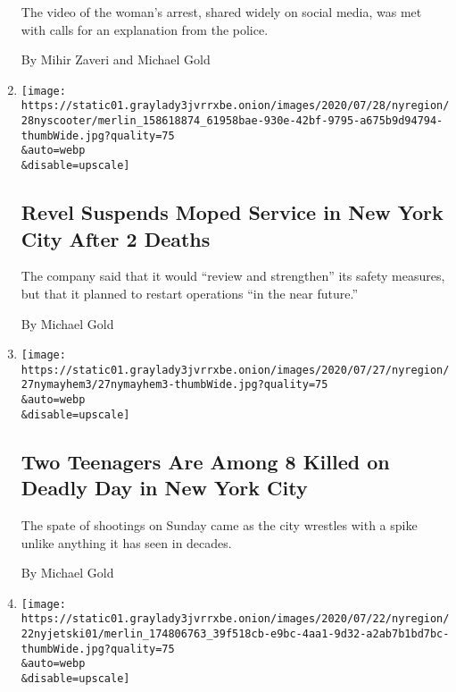 \begin{enumerate}
  The video of the woman's arrest, shared widely on social media, was
  met with calls for an explanation from the police.

  By Mihir Zaveri and Michael Gold
\item
  \href{/2020/07/28/nyregion/revel-scooters-death-nyc.html}{}

  \texttt{[image: https://static01.graylady3jvrrxbe.onion/images/2020/07/28/nyregion/28nyscooter/merlin\_158618874\_61958bae-930e-42bf-9795-a675b9d94794-thumbWide.jpg?quality=75\\\&auto=webp\\\&disable=upscale]}

  \hypertarget{revel-suspends-moped-service-in-new-york-city-after-2-deaths}{%
  \subsection{Revel Suspends Moped Service in New York City After 2
  Deaths}\label{revel-suspends-moped-service-in-new-york-city-after-2-deaths}}

  The company said that it would ``review and strengthen'' its safety
  measures, but that it planned to restart operations ``in the near
  future.''

  By Michael Gold
\item
  \href{/2020/07/27/nyregion/nyc-shootings-weekend.html}{}

  \texttt{[image: https://static01.graylady3jvrrxbe.onion/images/2020/07/27/nyregion/27nymayhem3/27nymayhem3-thumbWide.jpg?quality=75\\\&auto=webp\\\&disable=upscale]}

  \hypertarget{two-teenagers-are-among-8-killed-on-deadly-day-in-new-york-city}{%
  \subsection{Two Teenagers Are Among 8 Killed on Deadly Day in New York
  City}\label{two-teenagers-are-among-8-killed-on-deadly-day-in-new-york-city}}

  The spate of shootings on Sunday came as the city wrestles with a
  spike unlike anything it has seen in decades.

  By Michael Gold
\item
  \href{/2020/07/21/nyregion/jet-ski-accident-bronx-nyc.html}{}

  \texttt{[image: https://static01.graylady3jvrrxbe.onion/images/2020/07/22/nyregion/22nyjetski01/merlin\_174806763\_39f518cb-e9bc-4aa1-9d32-a2ab7b1bd7bc-thumbWide.jpg?quality=75\\\&auto=webp\\\&disable=upscale]}

  \hypertarget{2-killed-in-jet-ski-crash-as-waters-get-crowded-during-pandemic}{%
}
\end{enumerate}
